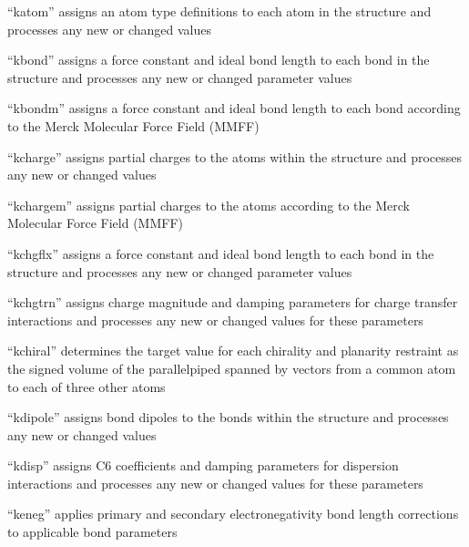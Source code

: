 \documentclass[letterpaper,11pt,english]{sphinxmanual}
\begin{document}

“katom” assigns an atom type definitions to each atom in
the structure and processes any new or changed values


“kbond” assigns a force constant and ideal bond length
to each bond in the structure and processes any new or
changed parameter values


“kbondm” assigns a force constant and ideal bond length to
each bond according to the Merck Molecular Force Field (MMFF)


“kcharge” assigns partial charges to the atoms within
the structure and processes any new or changed values


“kchargem” assigns partial charges to the atoms according to
the Merck Molecular Force Field (MMFF)


“kchgflx” assigns a force constant and ideal bond length
to each bond in the structure and processes any new or
changed parameter values


“kchgtrn” assigns charge magnitude and damping parameters for
charge transfer interactions and processes any new or changed
values for these parameters


“kchiral” determines the target value for each chirality
and planarity restraint as the signed volume of the
parallelpiped spanned by vectors from a common atom to
each of three other atoms


“kdipole” assigns bond dipoles to the bonds within
the structure and processes any new or changed values


“kdisp” assigns C6 coefficients and damping parameters for
dispersion interactions and processes any new or changed
values for these parameters


“keneg” applies primary and secondary electronegativity bond
length corrections to applicable bond parameters
\end{document}
